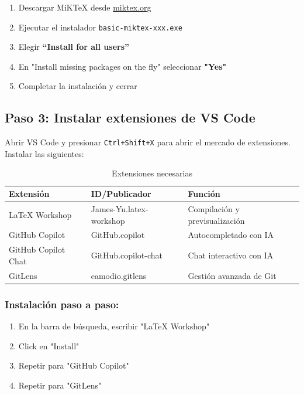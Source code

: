 \documentclass[11pt,a4paper]{article}
\newcommand{\codigo}[1]{\texttt{\textcolor{codigo}{#1}}}
\newcommand{\comando}[1]{\textcolor{azulprofundo}{\texttt{#1}}}
\begin{document}
	\begin{enumerate}
		\item Descargar MiKTeX desde \href{https://miktex.org}{miktex.org}
		\item Ejecutar el instalador \codigo{basic-miktex-xxx.exe}
		\item Elegir \textbf{``Install for all users''}
		\item En "Install missing packages on the fly" seleccionar \textbf{"Yes"}
		\item Completar la instalación y cerrar
	\end{enumerate}
	
	\subsection{Paso 3: Instalar extensiones de VS Code}
	
	Abrir VS Code y presionar \comando{Ctrl+Shift+X} para abrir el mercado de extensiones. Instalar las siguientes:
	
	\begin{table}[H]
		\centering
		\begin{tabular}{@{}lll@{}}
			\toprule
			\textbf{Extensión} & \textbf{ID/Publicador} & \textbf{Función} \\
			\midrule
			LaTeX Workshop & James-Yu.latex-workshop & Compilación y previsualización \\
			GitHub Copilot & GitHub.copilot & Autocompletado con IA \\
			GitHub Copilot Chat & GitHub.copilot-chat & Chat interactivo con IA \\
			GitLens & eamodio.gitlens & Gestión avanzada de Git \\
			\bottomrule
		\end{tabular}
		\caption{Extensiones necesarias}
		\label{tab:extensiones}
	\end{table}
	
	\subsubsection*{Instalación paso a paso:}
	\begin{enumerate}
		\item En la barra de búsqueda, escribir "LaTeX Workshop"
		\item Click en "Install"
		\item Repetir para "GitHub Copilot"
		\item Repetir para "GitLens"
	\end{enumerate}
	
\end{document}
